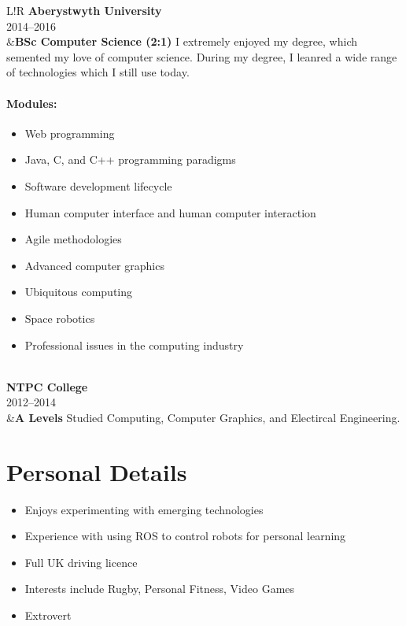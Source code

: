 \documentclass[10pt]{article}
\newcommand\VRule{\color{lightgray}\vrule width 0.5pt}
\begin{document}
\begin{longtable}{L!{\VRule}R}
{\bf Aberystwyth University}\\
2014--2016\\
&{\bf BSc Computer Science (2:1)}\newline
I extremely enjoyed my degree, which semented my love of computer science. During my degree, I leanred a wide range of technologies which I still use today.

\vspace{-3mm}
\paragraph{Modules:}
\begin{itemize}[noitemsep,topsep=0pt]
    \item Web programming
    \item Java, C, and C++ programming paradigms
    \item Software development lifecycle
    \item Human computer interface and human computer interaction
    \item Agile methodologies
    \item Advanced computer graphics
    \item Ubiquitous computing
    \item Space robotics
    \item Professional issues in the computing industry
\end{itemize}
\\

{\bf NTPC College}\\
2012--2014\\
&{\bf A Levels}\newline
Studied Computing, Computer Graphics, and Electircal Engineering.

\end{longtable}

\section*{Personal Details}
\begin{itemize}[noitemsep,topsep=0pt]
    \item Enjoys experimenting with emerging technologies
    \item Experience with using ROS to control robots for personal learning
	\item Full UK driving licence
	\item Interests include Rugby, Personal Fitness, Video Games
	\item Extrovert
\end{itemize}
\end{document}
